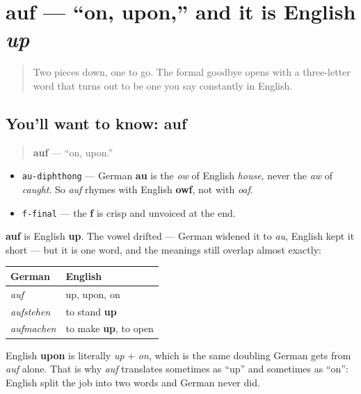 \section[auf]{auf — \textquotedblleft{}on, upon,\textquotedblright{} and it is English \emph{up}}

\label{lesson:GE-C04-auf}



\begin{quote}
Two pieces down, one to go. The formal goodbye opens with a three-letter word that turns out to be one you say constantly in English.
\end{quote}

\subsection*{You'll want to know: auf}
\begin{quote}
\textbf{auf} — \textquotedblleft{}on, upon.\textquotedblright{}
\end{quote}

\begin{sounds}
\begin{itemize}
\raggedright
  \item \texttt{au-diphthong} — German \textbf{au} is the \emph{ow} of English \emph{house}, never the \emph{aw} of \emph{caught}. So \emph{auf} rhymes with English \textbf{owf}, not with \emph{oaf}.
  \item \texttt{f-final} — the \textbf{f} is crisp and unvoiced at the end.
\end{itemize}
\end{sounds}

\begin{cousinweb}
\textbf{auf} is English \textbf{up}. The vowel drifted — German widened it to \emph{au}, English kept it short — but it is one word, and the meanings still overlap almost exactly:

\noindent
\begin{tabularx}{\linewidth}{@{}>{\raggedright\arraybackslash}X>{\raggedright\arraybackslash}X@{}}
\toprule
\textbf{German} & \textbf{English} \\
\midrule
\emph{auf} & up, upon, on \\
\emph{aufstehen} & to stand \textbf{up} \\
\emph{aufmachen} & to make \textbf{up}, to open \\
\bottomrule
\end{tabularx}

English \textbf{upon} is literally \emph{up} + \emph{on}, which is the same doubling German gets from \emph{auf} alone. That is why \emph{auf} translates sometimes as \textquotedblleft{}up\textquotedblright{} and sometimes as \textquotedblleft{}on\textquotedblright{}: English split the job into two words and German never did.
\end{cousinweb}

